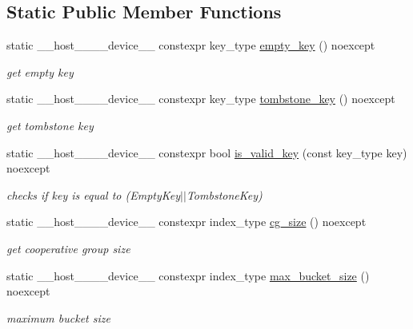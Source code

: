 \subsection*{Static Public Member Functions}
\begin{DoxyCompactItemize}
\item 
static \+\_\+\+\_\+host\+\_\+\+\_\+\+\_\+\+\_\+device\+\_\+\+\_\+ constexpr key\+\_\+type \hyperlink{classwarpcore_1_1BucketListHashTable_ad2c7ebaba6144a640fe66bf09a184c21}{empty\+\_\+key} () noexcept
\begin{DoxyCompactList}\small\item\em get empty key \end{DoxyCompactList}\item 
static \+\_\+\+\_\+host\+\_\+\+\_\+\+\_\+\+\_\+device\+\_\+\+\_\+ constexpr key\+\_\+type \hyperlink{classwarpcore_1_1BucketListHashTable_a985f5a5fc540a0a157a7508f8b326a50}{tombstone\+\_\+key} () noexcept
\begin{DoxyCompactList}\small\item\em get tombstone key \end{DoxyCompactList}\item 
static \+\_\+\+\_\+host\+\_\+\+\_\+\+\_\+\+\_\+device\+\_\+\+\_\+ constexpr bool \hyperlink{classwarpcore_1_1BucketListHashTable_aa5a011b8623deb47def1b8e029869f06}{is\+\_\+valid\+\_\+key} (const key\+\_\+type key) noexcept
\begin{DoxyCompactList}\small\item\em checks if {\ttfamily key} is equal to {\ttfamily }(Empty\+Key$\vert$$\vert$\+Tombstone\+Key) \end{DoxyCompactList}\item 
static \+\_\+\+\_\+host\+\_\+\+\_\+\+\_\+\+\_\+device\+\_\+\+\_\+ constexpr index\+\_\+type \hyperlink{classwarpcore_1_1BucketListHashTable_a3807ac1b39b47617d862c5dd17f21330}{cg\+\_\+size} () noexcept
\begin{DoxyCompactList}\small\item\em get cooperative group size \end{DoxyCompactList}\item 
static \+\_\+\+\_\+host\+\_\+\+\_\+\+\_\+\+\_\+device\+\_\+\+\_\+ constexpr index\+\_\+type \hyperlink{classwarpcore_1_1BucketListHashTable_a3b9c182c25464b5d6fa87d32f80fe281}{max\+\_\+bucket\+\_\+size} () noexcept
\begin{DoxyCompactList}\small\item\em maximum bucket size \end{DoxyCompactList}\end{DoxyCompactItemize}


